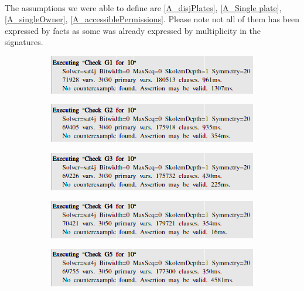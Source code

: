 \documentclass{article}
\begin{document}
	\paragraph{}The assumptions we were able to define are \ref{A_disjPlates}, \ref{A_Single plate}, \ref{A_singleOwner}, \ref{A_accessiblePermissions}. Please note not all of them has been expressed by facts as some was already expressed by multiplicity in the signatures.
	
	\begin{figure}
		\begin{subfigure}[H]{\linewidth}
			\includegraphics[width=\linewidth]{Images/Alloy_G1.png}
		\end{subfigure}
		\begin{subfigure}[H]{\linewidth}
			\includegraphics[width=\linewidth]{Images/Alloy_G2.png}
		\end{subfigure}
		\begin{subfigure}[H]{\linewidth}
			\includegraphics[width=\linewidth]{Images/Alloy_G3.png}
		\end{subfigure}
		\begin{subfigure}[H]{\linewidth}
			\includegraphics[width=\linewidth]{Images/Alloy_G4.png}
		\end{subfigure}
		\begin{subfigure}[H]{\linewidth}
			\includegraphics[width=\linewidth]{Images/Alloy_G5.png}

\end{subfigure}
\end{figure}
\end{document}
